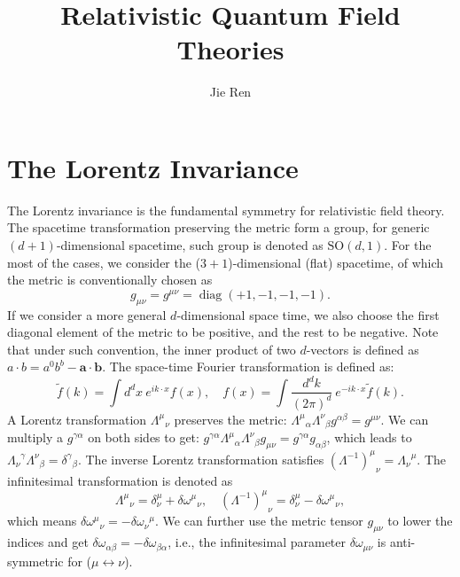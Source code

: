 \documentclass[aps,prb,superscriptaddress,nofootinbib]{revtex4}
\begin{document}
\title{Relativistic Quantum Field Theories}
\author{Jie Ren}



\maketitle

\tableofcontents

\section{The Lorentz Invariance}

The Lorentz invariance is the fundamental symmetry for relativistic field theory.
The spacetime transformation preserving the metric form a group, for generic $(d+1)$-dimensional spacetime, such group is denoted as $\mathrm{SO}(d,1)$.
For the most of the cases, we consider the ($3+1$)-dimensional (flat) spacetime, of which the metric is conventionally chosen as
\begin{equation}
	g_{\mu\nu}=g^{\mu\nu} = \operatorname{diag}(+1,-1,-1,-1).
\end{equation}
If we consider a more general $d$-dimensional space time, we also choose the first diagonal element of the metric to be positive, and the rest to be negative.
Note that under such convention, the inner product of two $d$-vectors is defined as $a \cdot b = a^0 b^b - \bm a \cdot \bm b$.
The space-time Fourier transformation is defined as:
\begin{equation}
	\tilde{f}(k) = \int d^{d}x\ e^{ik\cdot x} f(x), \quad
	f(x) = \int \frac{d^{d}k}{(2\pi)^{d}}\ e^{-ik\cdot x}\tilde{f}(k).
\end{equation}
A Lorentz transformation ${\Lambda^{\mu}}_{\nu}$ preserves the metric: ${\Lambda^{\mu}}_{\alpha}{\Lambda^{\nu}}_{\beta} g^{\alpha\beta} = g^{\mu\nu}$.
We can multiply a $g^{\gamma\alpha}$ on both sides to get: $g^{\gamma\alpha}{\Lambda^{\mu}}_{\alpha}{\Lambda^{\nu}}_{\beta} g_{\mu\nu} = g^{\gamma\alpha}g_{\alpha\beta}$, which leads to ${\Lambda_{\nu}}^{\gamma}{\Lambda^{\nu}}_{\beta} = {\delta^{\gamma}}_{\beta}$.
The inverse Lorentz transformation satisfies ${(\Lambda^{-1})^{\mu}}_{\nu} = {\Lambda_{\nu}}^{\mu}$.
The infinitesimal transformation is denoted as
\begin{equation}
	{\Lambda^{\mu}}_{\nu} = \delta^{\mu}_{\nu}+\delta{\omega^{\mu}}_{\nu}, \quad
	{(\Lambda^{-1})^\mu}_\nu = \delta^{\mu}_{\nu}-\delta{\omega^\mu}_\nu,
\end{equation}
which means $\delta {\omega^\mu}_\nu = -\delta {\omega_\nu}^\mu$.
We can further use the metric tensor $g_{\mu\nu}$ to lower the indices and get $\delta\omega_{\alpha\beta} = -\delta\omega_{\beta\alpha}$, i.e., the infinitesimal parameter $\delta \omega_{\mu\nu}$ is anti-symmetric for ($\mu \leftrightarrow \nu$).
\end{document}
